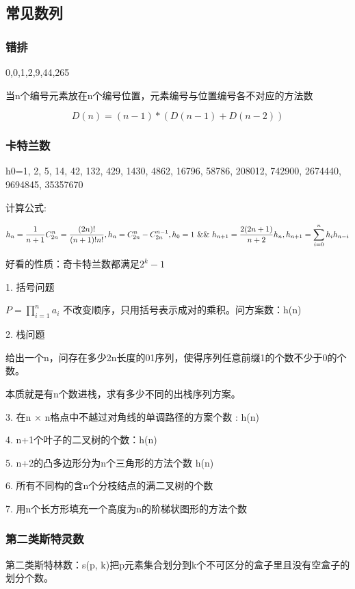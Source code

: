 \subsection{常见数列}

\subsubsection{错排}

0,0,1,2,9,44,265

当n个编号元素放在n个编号位置，元素编号与位置编号各不对应的方法数

$$
D(n) = (n-1)*(D(n-1) + D(n-2))
$$


\subsubsection{卡特兰数}

h0=1,    2, 5, 14, 42, 132, 429, 1430, 4862, 16796, 58786, 208012, 742900, 2674440, 9694845, 35357670

计算公式:

$$
h_n = \frac{1}{n+1}C_{2n}^{n} = \frac{(2n)!}{(n+1)!n!} ,\\
h_n = C_{2n}^{n} - C_{2n}^{n-1} ,\\
h_0 = 1\  \&\& \ h_{n+1} = \frac{2(2n+1)}{n+2} h_{n} ,\\
h_{n+1} = \sum_{i=0}^nh_{i}h_{n-i}
$$


好看的性质：奇卡特兰数都满足$2^k-1$

1. 括号问题

$P = \prod_{i=1}^n a_i$ 不改变顺序，只用括号表示成对的乘积。问方案数：h(n)

2. 栈问题

给出一个n，问存在多少2n长度的01序列，使得序列任意前缀1的个数不少于0的个数。

本质就是有n个数进栈，求有多少不同的出栈序列方案。

3. 在n × n格点中不越过对角线的单调路径的方案个数 : h(n)

4. n+1个叶子的二叉树的个数：h(n)

5. n+2的凸多边形分为n个三角形的方法个数 h(n)

6. 所有不同构的含n个分枝结点的满二叉树的个数

7. 用n个长方形填充一个高度为n的阶梯状图形的方法个数

\subsubsection{第二类斯特灵数}
第二类斯特林数：s(p, k)把p元素集合划分到k个不可区分的盒子里且没有空盒子的划分个数。



